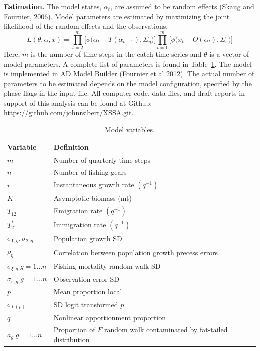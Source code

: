 \documentclass[12pt,letterpaper]{article}
\begin{document}
{\bf Estimation.} The model states, $\alpha_t$, are assumed to be random
effects (Skaug and Fournier, 2006). Model parameters are estimated by
maximizing the joint likelihood of the random
effects and the observations.
\begin{equation}
L(\theta,\alpha,x)=
\prod^m_{t=2}\big[\phi\big(\alpha_t-T(\alpha_{t-1}), \Sigma_\eta\big)\big]
\prod^m_{t=1}\big[\phi\big(x_t-O(\alpha_t), \Sigma_\varepsilon\big)\big]
\end{equation}
Here, $m$ is the number of time steps in the catch time series and
$\theta$ is a vector of model parameters. A complete list of
parameters is found in Table~\ref{tab:allvars}. 
The model is implemented in AD Model Builder (Fournier et al 2012).
The actual number of
parameters to be estimated depends on the model configuration,
specified by the phase flags in the input file. 
All computer code, data files, and draft reports in support of this
analysis can be found at Github:\linebreak
\url{https://github.com/johnrsibert/XSSA.git}.


\begin{table}
\caption{Model variables.
\label{tab:allvars}}
\begin{center}
\begin{tabular}{ll}
\hline
Variable & Definition\\
\hline
\hline
$m$ & Number of quarterly time steps\\
$n$ & Number of fishing gears\\
\hline
\hline
$r$ & Instantaneous growth rate $(q^{-1})$\\
$K$ & Asymptotic biomass (mt) \\
$T_{12}$ & Emigration rate $(q^{-1})$\\
$T^*_{21}$& Immigration rate $(q^{-1})$\\
$\sigma_{1,\eta}, \sigma_{2,\eta}$ & Population growth SD\\
$\rho_\eta$ & Correlation between population growth precess errors\\
$\sigma_{\xi,g}\; g=1\ldots n$ & Fishing mortality random walk SD\\
$\sigma_{\varepsilon,g}\; g=1\ldots n$ & Observation error SD \\
$\bar{p}$ & Mean proportion local\\
$\sigma_{L(p)}$ & SD logit transformed $p$\\
$q$ & Nonlinear apportionment proportion\\
$a_g\; g=1\ldots n$ & Proportion of $F$ random walk contaminated by 
fat-tailed distribution\\
\hline
\end{tabular}
\end{center}
\end{table}
\end{document}
